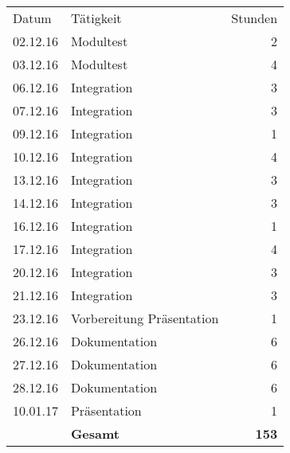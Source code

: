 \begin{minipage}{0.5\textwidth}
    \begin{tabular}{llr}
       Datum& Tätigkeit&Stunden\\
       02.12.16&Modultest&2 \\
       03.12.16&Modultest&4 \\
       06.12.16&Integration&3 \\
       07.12.16&Integration&3 \\
       09.12.16&Integration&1 \\
       10.12.16&Integration&4 \\
       13.12.16&Integration&3 \\
       14.12.16&Integration&3 \\
       16.12.16&Integration&1 \\
       17.12.16&Integration&4 \\
       20.12.16&Integration&3 \\
       21.12.16&Integration&3 \\
       23.12.16&Vorbereitung Präsentation&1 \\
       26.12.16&Dokumentation&6 \\
       27.12.16&Dokumentation&6 \\
       28.12.16&Dokumentation&6 \\
       10.01.17&Präsentation&1 \\
       &\textbf{Gesamt}&\textbf{153}
    \end{tabular}
\end{minipage}
